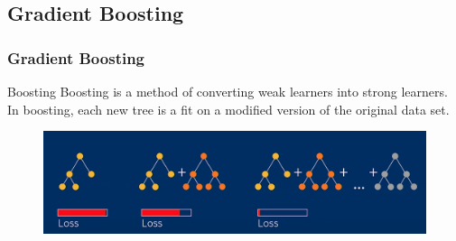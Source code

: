 \documentclass{beamer}
\begin{document}
\subsection{Gradient Boosting}
\begin{frame}
\frametitle{Gradient Boosting}
\begin{block}{Boosting}
 Boosting is a method of converting weak learners into strong learners. In boosting, each new tree is a fit on a modified version of the original data set.
\end{block}
 \begin{figure}[h]
 \includegraphics[scale=0.25]{boosting.png}
\end{figure}
\end{frame}
\end{document}

